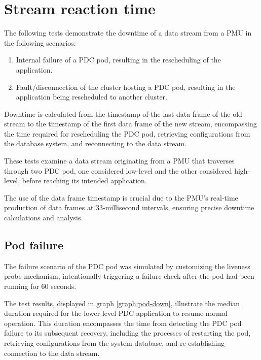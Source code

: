 \section{Stream reaction time}
The following tests demonstrate the downtime of a data stream from a PMU in the following scenarios:

\begin{enumerate}
\item Internal failure of a PDC pod, resulting in the rescheduling of the application. 
\item Fault/disconnection of the cluster hosting a PDC pod, resulting in the application being rescheduled to another cluster.
\end{enumerate}

Downtime is calculated from the timestamp of the last data frame of the old stream to the timestamp of the first data frame of the new stream, encompassing the time required for rescheduling the PDC pod, retrieving configurations from the database system, and reconnecting to the data stream.

These tests examine a data stream originating from a PMU that traverses through two PDC pod, one considered low-level and the other considered high-level, before reaching its intended application.

The use of the data frame timestamp is crucial due to the PMU's real-time production of data frames at 33-millisecond intervals, ensuring precise downtime calculations and analysis.
\subsection{Pod failure}
The failure scenario of the PDC pod was simulated by customizing the liveness probe mechanism, intentionally triggering a failure check after the pod had been running for 60 seconds.

The test results, displayed in graph \ref{graph:pod-down}, illustrate the median duration required for the lower-level PDC application to resume normal operation. This duration encompasses the time from detecting the PDC pod failure to its subsequent recovery, including the processes of restarting the pod, retrieving configurations from the system database, and re-establishing connection to the data stream.

